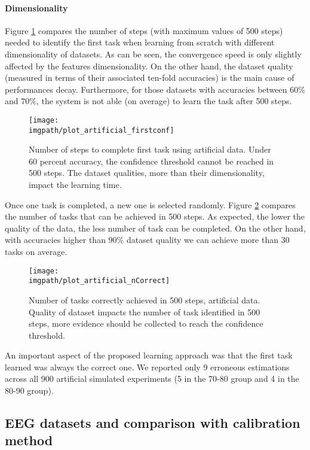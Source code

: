 \paragraph{Dimensionality}

Figure \ref{fig:firstArtificial} compares the number of steps (with maximum values of 500 steps) needed to identify the first task when learning from scratch with different dimensionality of datasets. As can be seen, the convergence speed is only slightly affected by the features dimensionality. On the other hand, the dataset quality (measured in terms of their associated ten-fold accuracies) is the main cause of performances decay. Furthermore, for those datasets with accuracies between $60\%$ and $70\%$, the system is not able (on average) to learn the task after 500 steps.

\begin{figure}[!h]
  \centering
      \texttt{[image: \\imgpath/plot\_artificial\_firstconf]}
      \caption{Number of steps to complete first task using artificial data. Under 60 percent accuracy, the confidence threshold cannot be reached in 500 steps. The dataset qualities, more than their dimensionality, impact the learning time.}
      \label{fig:firstArtificial}
\end{figure} 

Once one task is completed, a new one is selected randomly. Figure \ref{fig:nCorrectArtificial} compares the number of tasks that can be achieved in 500 steps. As expected, the lower the quality of the data, the less number of task can be completed. On the other hand, with accuracies higher than $90\%$ dataset quality we can achieve more than 30 tasks on average. 

\begin{figure}[!h]
    \centering
    \texttt{[image: \\imgpath/plot\_artificial\_nCorrect]}
    \caption{Number of tasks correctly achieved in 500 steps, artificial data. Quality of dataset impacts the number of task identified in 500 steps, more evidence should be collected to reach the confidence threshold.}
    \label{fig:nCorrectArtificial}
\end{figure} 

An important aspect of the proposed learning approach was that the first task learned was always the correct one. We reported only 9 erroneous estimations across all 900 artificial simulated experiments (5 in the 70-80 group and 4 in the 80-90 group).

\subsection{EEG datasets and comparison with calibration method}

